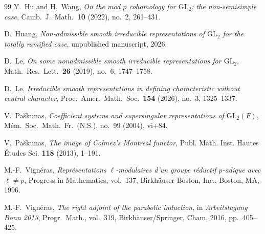 \documentclass[a4paper,10pt,twoside]{amsart}
\theoremstyle{definition}
\numberwithin{equation}{section}
\begin{document}
\begin{thebibliography}{99}
Y.~Hu and H.~Wang,
\textit{On the mod \(p\) cohomology for \(\mathrm{GL}_2\):
the non-semisimple case},
Camb.\ J.\ Math.\ \textbf{10} (2022), no.~2, 261--431.

D.~Huang,
\newblock \emph{Non-admissible smooth irreducible representations of $\mathrm{GL}_2$ for the totally ramified case},
\newblock unpublished manuscript, 2026.

D.~Le,
\textit{On some nonadmissible smooth irreducible representations for
\(\mathrm{GL}_2\)},
Math.\ Res.\ Lett.\ \textbf{26} (2019), no.~6, 1747--1758.

D.~Le,
\textit{Irreducible smooth representations in defining characteristic
without central character},
Proc.\ Amer.\ Math.\ Soc.\ \textbf{154} (2026), no.~3, 1325--1337.

V.~Pa\v{s}k\={u}nas,
\textit{Coefficient systems and supersingular representations of
\(\mathrm{GL}_2(F)\)},
M\'em.\ Soc.\ Math.\ Fr.\ (N.S.), no.~99 (2004), vi+84.

V.~Pa\v{s}k\={u}nas,
\emph{The image of Colmez's Montreal functor},
Publ. Math. Inst. Hautes \'{E}tudes Sci. \textbf{118} (2013), 1--191.

M.-F.~Vign\'eras,
\textit{Repr\'esentations \(\ell\)-modulaires d'un groupe r\'eductif
\(p\)-adique avec \(\ell\neq p\)},
Progress in Mathematics, vol.~137,
Birkh\"auser Boston, Inc., Boston, MA, 1996.

M.-F.~Vign\'eras,
\textit{The right adjoint of the parabolic induction},
in \textit{Arbeitstagung Bonn 2013},
Progr.\ Math., vol.~319,
Birkh\"auser/Springer, Cham, 2016, pp.~405--425.

\end{thebibliography}
\end{document}
